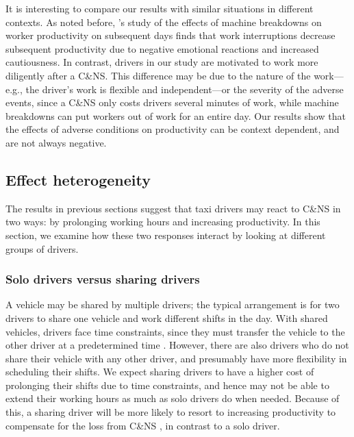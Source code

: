 \documentclass[reviewmode]{restat}
\begin{document}
It is interesting to compare our results with similar situations in different contexts. As noted before, 
\citeauthor{cai2017recover}'s \citeyear{cai2017recover} study of the effects of  machine breakdowns on worker 
productivity on subsequent days finds that work interruptions decrease subsequent productivity due to
negative emotional reactions and increased cautiousness. In contrast, drivers in our study are motivated 
to work more diligently after a C\&NS. This difference may be due to the nature of the work---e.g., the 
driver's work is flexible and independent---or the severity of the adverse events, since a C\&NS only costs
drivers several minutes of work, while machine breakdowns can put workers out of work for an entire day.
Our results show that the %
effects of adverse conditions on productivity can be context dependent,
and are not always negative.

\subsection{Effect heterogeneity}

The results in previous sections suggest that taxi drivers may react to C\&NS in two ways: by prolonging 
working hours and increasing productivity. In this section, we examine how these two responses interact 
by looking at different groups of drivers.

\subsubsection{Solo drivers versus sharing drivers}

A vehicle may be shared by multiple drivers; the typical %
arrangement is for two drivers to share one 
vehicle and work different shifts in the day. With shared vehicles, drivers face time constraints, 
since they must transfer the vehicle to the other driver at a predetermined time%
. However, there are also drivers who do not share their vehicle with any 
other driver, and presumably have more flexibility in scheduling their shifts.
We expect sharing drivers to have a higher cost of prolonging their shifts due to time constraints, 
and hence may not be able to extend their working hours as much as solo drivers do when needed. 
Because of this, a sharing driver will be more likely to resort to increasing productivity to compensate 
for the loss from C\&NS%
, in contrast to a solo driver.
\end{document}
